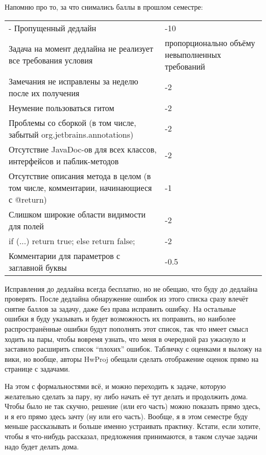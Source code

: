 \documentclass[a5paper]{article}
\begin{document}
Напомню про то, за что снимались баллы в прошлом семестре:
\begin{small}
	\begin{tabu} {| X[1 l p] | X[0.3 l p] |}
		\tabucline-
		\everyrow{\tabucline-}
		Пропущенный дедлайн                                                                   & -10 \\
		Задача на момент дедлайна не реализует все требования условия                         & пропорционально объёму невыполненных требований \\
		Замечания не исправлены за неделю после их получения                                  & -2 \\
		Неумение пользоваться гитом                                                           & -2 \\
		Проблемы со сборкой (в том числе, забытый org.jetbrains.annotations)                  & -2 \\
		Отсутствие JavaDoc-ов для всех классов, интерфейсов и паблик-методов                  & -2 \\
		Отсутствие описания метода в целом (в том числе, комментарии, начинающиеся с @return) & -1 \\
		Слишком широкие области видимости для полей                                           & -2 \\
		if (...) return true; else return false;                                              & -2 \\
		Комментарии для параметров с заглавной буквы                                          & -0.5 \\
	\end{tabu}
\end{small}

Исправления до дедлайна всегда бесплатно, но не обещаю, что буду до дедлайна проверять. После дедлайна обнаружение ошибок из этого списка сразу влечёт снятие баллов за задачу, даже без права исправить ошибку. На остальные ошибки я буду указывать и будет возможность их поправить, но наиболее распространённые ошибки будут пополнять этот список, так что имеет смысл ходить на пары, чтобы вовремя узнать, что меня в очередной раз ужаснуло и заставило расширить список ``плохих'' ошибок. Табличку с оценками я выложу на вики, но вообще, авторы HwProj обещали сделать отображение оценок прямо на странице с задачами.

На этом с формальностями всё, и можно переходить к задаче, которую желательно сделать за пару, ну либо начать её тут делать и продолжить дома. Чтобы было не так скучно, решение (или его часть) можно показать прямо здесь, и я его прямо здесь зачту (ну или его часть). Вообще, я в этом семестре буду меньше рассказывать и больше именно устраивать практику. Кстати, если хотите, чтобы я что-нибудь рассказал, предложения принимаются, в таком случае задачи надо будет делать дома.
\end{document}
